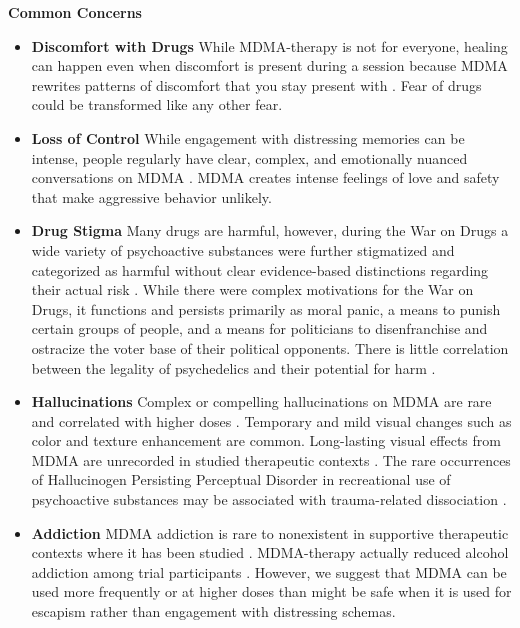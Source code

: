 \documentclass[12pt,letterpaper]{article}
\begin{document}
\noindent \textbf{Common Concerns}
\begin{itemize}
    \item \textbf{Discomfort with Drugs}
     While MDMA-therapy is not for everyone, healing can happen even when discomfort is present during a session because MDMA rewrites patterns of discomfort that you stay present with \cite{fedduciaMDMAMemoryReconsolidation}. Fear of drugs could be transformed like any other fear.
    \item \textbf{Loss of Control}    
        While engagement with distressing memories can be intense, people regularly have clear, complex, and emotionally nuanced conversations on MDMA \cite{colbertEvenings,passieHistory}. MDMA creates intense feelings of love and safety that make aggressive behavior unlikely.
    \item \textbf{Drug Stigma}
        Many drugs are harmful, however, during the War on Drugs a wide variety of psychoactive substances were further stigmatized and categorized as harmful without clear evidence-based distinctions regarding their actual risk \cite{alexanderNewJimCrow,nuttDrugHarms}. While there were complex motivations for the War on Drugs, it functions and persists primarily as moral panic, a means to punish certain groups of people, and a means for politicians to disenfranchise and ostracize the voter base of their political opponents. There is little correlation between the legality of psychedelics and their potential for harm \cite{nuttDrugHarms}.
    \item \textbf{Hallucinations}
        Complex or compelling hallucinations on MDMA are rare and correlated with higher doses \cite{liechtiGender}. Temporary and mild visual changes such as color and texture enhancement are common. Long-lasting visual effects from MDMA are unrecorded in studied therapeutic contexts \cite{vizeliActuteEffects}. The rare occurrences of Hallucinogen Persisting Perceptual Disorder in recreational use of psychoactive substances may be associated with trauma-related dissociation \cite{halpernHPPD}.
    \item \textbf{Addiction}
        MDMA addiction is rare to nonexistent in supportive therapeutic contexts where it has been studied \cite{mitchellMDMAClinicalTrial2,mitchellMDMAClinicalTrial}. MDMA-therapy actually reduced alcohol addiction among trial participants \cite{nicholasAlcohol}. However, we suggest that MDMA can be used more frequently or at higher doses than might be safe when it is used for escapism rather than engagement with distressing schemas. 

\end{itemize}
\end{document}
